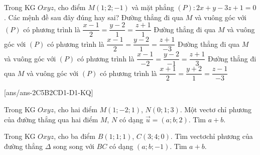 \begin{ex}%
	Trong KG $Oxyz$, cho điểm $M(1;2;-1)$ và mặt phẳng $(P)\colon 2x+y-3z+1=0$. Các mệnh đề sau đây đúng hay sai?
	\choiceTF
	{ Đường thẳng đi qua $M$ và vuông góc với $(P)$ có phương trình là $\dfrac{x-1}{2}=\dfrac{y-2}{1}=\dfrac{z+1}{1}$}
	{\True  Đường thẳng đi qua $M$ và vuông góc với $(P)$ có phương trình là $\dfrac{x-1}{2}=\dfrac{y-2}{1}=\dfrac{z+1}{-3}$}
	{\True  Đường thẳng đi qua $M$ và vuông góc với ${(P)}$ có phương trình là $\dfrac{x-1}{-2}=\dfrac{y-2}{-1}=\dfrac{z+1}{3}$}
	{Đường thẳng đi qua $M$ và vuông góc với $(P)$ có phương trình là $\dfrac{x+1}{2}=\dfrac{y+2}{1}=\dfrac{z-1}{-3}$}
\end{ex}


[ans/ans-2C5B2CD1-D1-KQ]
\TNSA
\begin{ex}%
	Trong KG $Oxyz$, cho hai điểm $M\left( 1;-2;1 \right)$, $N\left( 0;1;3 \right)$. Một vectơ chỉ phương của đường thẳng qua hai điểm $M$, $N$ có dạng $\overrightarrow{u}=(a;b;2)$. Tìm $a+b.$
\end{ex}
\begin{ex}%
	Trong KG $Oxyz$, cho ba điểm $B\left( 1;1;1 \right)$, $C\left( 3;4;0 \right)$. Tìm vectơchỉ phương của đường thẳng $\Delta $ song song với $BC$ có dạng $(a;b;-1)$. Tìm $a+b$.
\end{ex}

